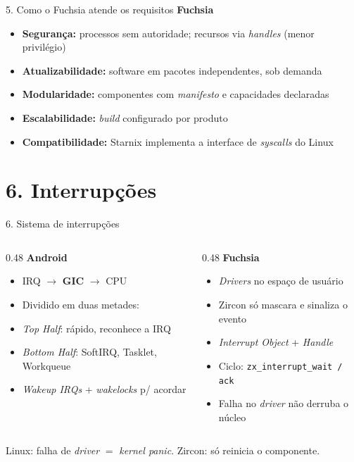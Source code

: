 \documentclass[aspectratio=169,11pt]{beamer}
\newcommand{\ANDROID}{\textbf{\color{androidVerde}Android}}
\newcommand{\FUCHSIA}{\textbf{\color{fuchsiaCor}Fuchsia}}
\newcommand{\comparar}[2]{%
  \begin{columns}[T,onlytextwidth]
    \begin{column}{0.48\textwidth}
      \ANDROID\par\smallskip
      \begin{itemize}\footnotesize #1 \end{itemize}
    \end{column}
    \begin{column}{0.48\textwidth}
      \FUCHSIA\par\smallskip
      \begin{itemize}\footnotesize #2 \end{itemize}
    \end{column}
  \end{columns}%
}
\begin{document}
\begin{frame}{5. Como o Fuchsia atende os requisitos}
  \FUCHSIA
  \begin{itemize}\footnotesize
    \item \textbf{Segurança:} processos sem autoridade; recursos via \emph{handles} (menor privilégio)
    \item \textbf{Atualizabilidade:} software em pacotes independentes, sob demanda
    \item \textbf{Modularidade:} componentes com \emph{manifesto} e capacidades declaradas
    \item \textbf{Escalabilidade:} \emph{build} configurado por produto
    \item \textbf{Compatibilidade:} Starnix implementa a interface de \emph{syscalls} do Linux
  \end{itemize}
\end{frame}

\section{6. Interrupções}

\begin{frame}{6. Sistema de interrupções}
  \comparar{
    \item IRQ $\rightarrow$ \textbf{GIC} $\rightarrow$ CPU
    \item Dividido em duas metades:
    \item \quad \emph{Top Half}: rápido, reconhece a IRQ
    \item \quad \emph{Bottom Half}: SoftIRQ, Tasklet, Workqueue
    \item \emph{Wakeup IRQs} + \emph{wakelocks} p/ acordar
  }{
    \item \emph{Drivers} no espaço de usuário
    \item Zircon só mascara e sinaliza o evento
    \item \emph{Interrupt Object} + \emph{Handle}
    \item Ciclo: \texttt{zx\_interrupt\_wait / ack}
    \item Falha no \emph{driver} não derruba o núcleo
  }
  \vfill
  \begin{center}\small
    Linux: falha de \emph{driver} $=$ \emph{kernel panic}. \quad Zircon: só reinicia o componente.
  \end{center}
\end{frame}
\end{document}
